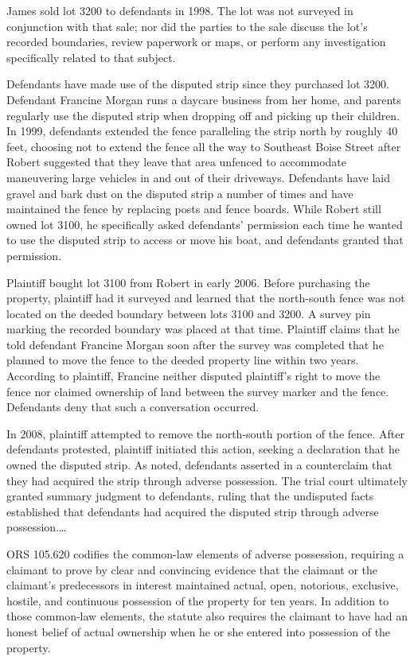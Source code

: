 James sold lot 3200 to defendants in 1998. The lot was not surveyed in
conjunction with that sale; nor did the parties to the sale discuss the lot's
recorded boundaries, review paperwork or maps, or perform any investigation
specifically related to that subject.

Defendants have made use of the disputed strip since they purchased lot 3200.
Defendant Francine Morgan runs a daycare business from her home, and parents
regularly use the disputed strip when dropping off and picking up their
children. In 1999, defendants extended the fence paralleling the strip north by
roughly 40 feet, choosing not to extend the fence all the way to Southeast
Boise Street after Robert suggested that they leave that area unfenced to
accommodate maneuvering large vehicles in and out of their driveways.
Defendants have laid gravel and bark dust on the disputed strip a number of
times and have maintained the fence by replacing posts and fence boards. While
Robert still owned lot 3100, he specifically asked defendants' permission each
time he wanted to use the disputed strip to access or move his boat, and
defendants granted that permission.

Plaintiff bought lot 3100 from Robert in early 2006. Before purchasing the
property, plaintiff had it surveyed and learned that the north-south fence was
not located on the deeded boundary between lots 3100 and 3200. A survey pin
marking the recorded boundary was placed at that time. Plaintiff claims that he
told defendant Francine Morgan soon after the survey was completed that he
planned to move the fence to the deeded property line within two years.
According to plaintiff, Francine neither disputed plaintiff's right to move the
fence nor claimed ownership of land between the survey marker and the fence.
Defendants deny that such a conversation occurred.

In 2008, plaintiff attempted to remove the north-south portion of the fence.
After defendants protested, plaintiff initiated this action, seeking a
declaration that he owned the disputed strip. As noted, defendants asserted in
a counterclaim that they had acquired the strip through adverse possession. The
trial court ultimately granted summary judgment to defendants, ruling that the
undisputed facts established that defendants had acquired the disputed strip
through adverse possession.\ldots

ORS 105.620 codifies the common-law elements of adverse possession, requiring a
claimant to prove by clear and convincing evidence that the claimant or the
claimant's predecessors in interest maintained actual, open, notorious,
exclusive, hostile, and continuous possession of the property for ten years. In
addition to those common-law elements, the statute also requires the claimant
to have had an honest belief of actual ownership when he or she entered into
possession of the property.

